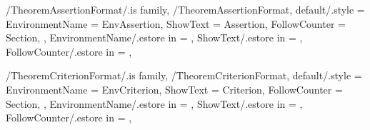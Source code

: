 \newcommand{\InitTheoremQuestionFormat}
{%
  \theoremstyle{definition}%
  \ifthenelse{\equal{\GetTheoremQuestionFormatFollowCounter}{\empty}}%
  {%
    \newtheorem{%
      \GetTheoremQuestionFormatEnvironmentName}{%
      \GetTheoremQuestionFormatShowText}%
  }%
  {%
    \MappingTheoremCounter[Question]{\GetTheoremQuestionFormatFollowCounter}%
    \newtheorem{%
      \GetTheoremQuestionFormatEnvironmentName}{%
      \GetTheoremQuestionFormatShowText}[%
      \GetTheoremQuestionFormatFollowCounter]%
  }%
} %


\pgfkeys
{
  /TheoremAssertionFormat/.is family, /TheoremAssertionFormat,
  default/.style =
  {
    EnvironmentName = {EnvAssertion},
    ShowText = {Assertion},
    FollowCounter = Section,
  },
  EnvironmentName/.estore in = \GetTheoremAssertionFormatEnvironmentName,
  ShowText/.estore in = \GetTheoremAssertionFormatShowText,
  FollowCounter/.estore in = \GetTheoremAssertionFormatFollowCounter,
} %

\newcommand{\InsertAssertion}[2][\empty]
{%
  \InsertTheoremContent[#1]{\GetTheoremAssertionFormatEnvironmentName}{#2}%
} %

\newcommand{\InitTheoremAssertionFormat}
{%
  \theoremstyle{plain}%
  \ifthenelse{\equal{\GetTheoremAssertionFormatFollowCounter}{\empty}}%
  {%
    \newtheorem{%
      \GetTheoremAssertionFormatEnvironmentName}{%
      \GetTheoremAssertionFormatShowText}%
  }%
  {%
    \MappingTheoremCounter[Assertion]{\GetTheoremAssertionFormatFollowCounter}%
    \newtheorem{%
      \GetTheoremAssertionFormatEnvironmentName}{%
      \GetTheoremAssertionFormatShowText}[%
      \GetTheoremAssertionFormatFollowCounter]%
  }%
} %


\pgfkeys
{
  /TheoremCriterionFormat/.is family, /TheoremCriterionFormat,
  default/.style =
  {
    EnvironmentName = {EnvCriterion},
    ShowText = {Criterion},
    FollowCounter = Section,
  },
  EnvironmentName/.estore in = \GetTheoremCriterionFormatEnvironmentName,
  ShowText/.estore in = \GetTheoremCriterionFormatShowText,
  FollowCounter/.estore in = \GetTheoremCriterionFormatFollowCounter,
} %

\newcommand{\InsertCriterion}[2][\empty]
{%
  \InsertTheoremContent[#1]{\GetTheoremCriterionFormatEnvironmentName}{#2}%
} %

